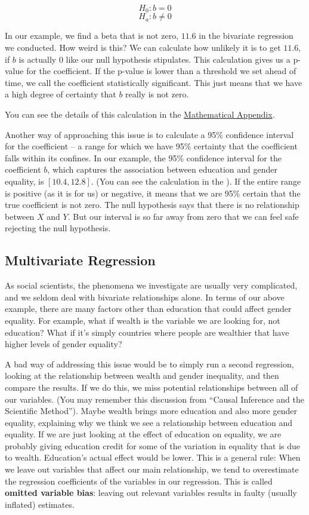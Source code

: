 \documentclass{book}
\begin{document}
\[H_0: b = 0\] \[H_a: b \neq 0\]

In our example, we find a beta that is not zero, \(11.6\) in the bivariate
regression we conducted. How weird is this? We can calculate how unlikely it
is to get \(11.6\), if \(b\) is actually 0 like our null hypothesis
stipulates. This calculation gives us a p-value for the coefficient. If the
p-value is lower than a threshold we set ahead of time, we call the
coefficient statistically significant. This just means that we have a high
degree of certainty that \(b\) really is not zero.

You can see the details of this calculation in the
\href{./mathematical-appendix.html}{Mathematical Appendix}.

Another way of approaching this issue is to calculate a 95\% confidence
interval for the coefficient -- a range for which we have 95\% certainty that
the coefficient falls within its confines. In our example, the 95\% confidence
interval for the coefficient \(b\), which captures the association between
education and gender equality, is \([10.4, 12.8]\). (You can see the
calculation in the ). If the entire range is positive (as it is for us) or
negative, it means that we are 95\% certain that the true coefficient is not
zero. The null hypothesis says that there is no relationship between \(X\) and
\(Y\). But our interval is so far away from zero that we can feel safe
rejecting the null hypothesis.

\hypertarget{multivariate-regression}{%
\subsection{Multivariate Regression}\label{multivariate-regression}}

As social scientists, the phenomena we investigate are usually very
complicated, and we seldom deal with bivariate relationships alone. In terms
of our above example, there are many factors other than education that could
affect gender equality. For example, what if wealth is the variable we are
looking for, not education? What if it's simply countries where people are
wealthier that have higher levels of gender equality?

A bad way of addressing this issue would be to simply run a second regression,
looking at the relationship between wealth and gender inequality, and then
compare the results. If we do this, we miss potential relationships between
all of our variables. (You may remember this discussion from ``Causal
Inference and the Scientific Method''). Maybe wealth brings more education and
also more gender equality, explaining why we think we see a relationship
between education and equality. If we are just looking at the effect of
education on equality, we are probably giving education credit for some of the
variation in equality that is due to wealth. Education's actual effect would
be lower. This is a general rule: When we leave out variables that affect our
main relationship, we tend to overestimate the regression coefficients of the
variables in our regression. This is called \textbf{omitted variable bias}:
leaving out relevant variables results in faulty (usually inflated) estimates.
\end{document}
